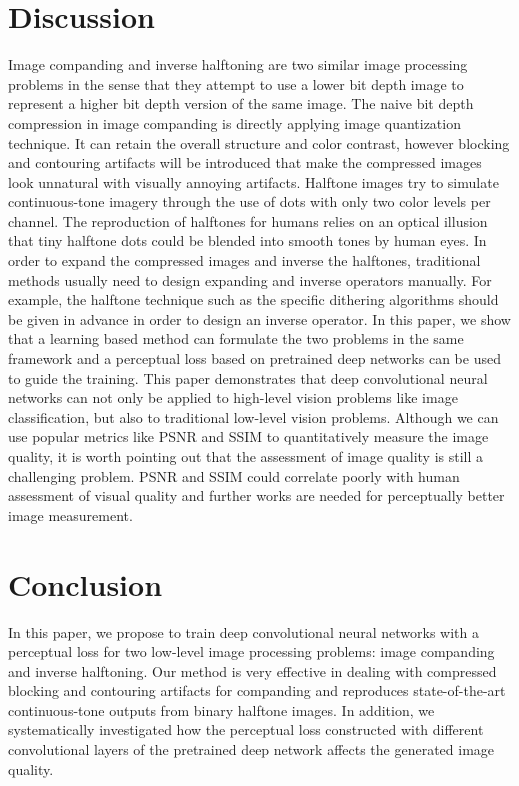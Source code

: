 \documentclass[journal]{IEEEtran}
\begin{document}
\section{Discussion}
Image companding and inverse halftoning are two similar image processing problems in the sense that they attempt to use a lower bit depth image to represent a higher bit depth version of the same image. The naive bit depth compression in image companding is directly applying image quantization technique. It can retain the overall structure and color contrast, however blocking and contouring artifacts will be introduced that make the compressed images look unnatural with visually annoying artifacts. Halftone images try to simulate continuous-tone imagery through the use of dots with only two color levels per channel. The reproduction of halftones for humans relies on an optical illusion that tiny halftone dots could be blended into smooth tones by human eyes. In order to expand the compressed images and inverse the halftones, traditional methods usually need to design expanding and inverse operators manually. For example, the halftone technique such as the specific dithering algorithms should be given in advance in order to design an inverse operator. In this paper, we show that a learning based method can formulate the two problems in the same framework and a perceptual loss based on pretrained deep networks can be used to guide the training. This paper demonstrates that deep convolutional neural networks can not only be applied to high-level vision problems like image classification, but also to traditional low-level vision problems. Although we can use popular metrics like PSNR and SSIM to quantitatively measure the image quality, it is worth pointing out that the assessment of image quality is still a challenging problem. PSNR and SSIM could correlate poorly with human assessment of visual quality and further works are needed for perceptually better image measurement.


\section{Conclusion}
In this paper, we propose to train deep convolutional neural networks with a perceptual loss for two low-level image processing problems: image companding and inverse halftoning. Our method is very effective in dealing with compressed blocking and contouring artifacts for companding and reproduces state-of-the-art continuous-tone outputs from binary halftone images. In addition, we systematically investigated how the perceptual loss constructed with different convolutional layers of the pretrained deep network affects the generated image quality.
\end{document}
